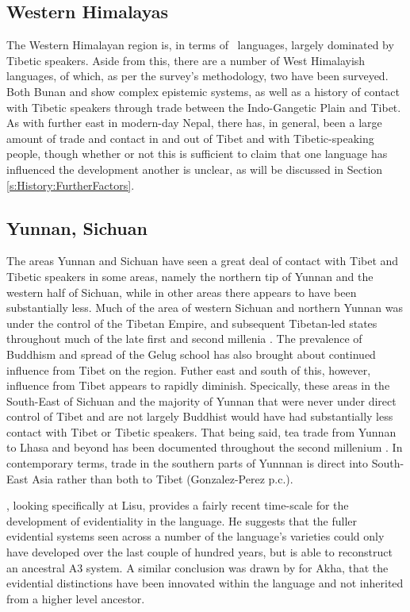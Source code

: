 \subsection{Western Himalayas}
The Western Himalayan region is, in terms of \lfam\ languages, largely dominated by Tibetic speakers. Aside from this, there are a number of West Himalayish languages, of which, as per the survey's methodology, two have been surveyed. Both Bunan  and  show complex epistemic systems, as well as a history of contact with Tibetic speakers through trade between the Indo-Gangetic Plain and Tibet. As with further east in modern-day Nepal, there has, in general, been a large amount of trade and contact in and out of Tibet and with Tibetic-speaking people, though whether or not this is sufficient to claim that one language has influenced the development another is unclear, as will be discussed in Section \ref{s:History:FurtherFactors}.

\subsection{Yunnan, Sichuan}\label{ss:History:YunSich}
The areas Yunnan and Sichuan have seen a great deal of contact with Tibet and Tibetic speakers in some areas, namely the northern tip of Yunnan and the western half of Sichuan, while in other areas there appears to have been substantially less. Much of the area of western Sichuan and northern Yunnan was under the control of the Tibetan Empire, and subsequent Tibetan-led states throughout much of the late first and second millenia \cite{Schaik2013}. The prevalence of Buddhism and spread of the Gelug school has also brought about continued influence from Tibet on the region. Futher east and south of this, however, influence from Tibet appears to rapidly diminish. Specically, these areas in the South-East of Sichuan and the majority of Yunnan that were never under direct control of Tibet and are not largely Buddhist would have had substantially less contact with Tibet or Tibetic speakers. That being said, tea trade from Yunnan to Lhasa and beyond has been documented throughout the second millenium \cite{Sigley2020}. In contemporary terms, trade in the southern parts of Yunnnan is direct into South-East Asia rather than both to Tibet (Gonzalez-Perez p.c.).

, looking specifically at Lisu, provides a fairly recent time-scale for the development of evidentiality in the language. He suggests that the fuller evidential systems seen across a number of the language's varieties could only have developed over the last couple of hundred years, but is able to reconstruct an ancestral A3 system. A similar conclusion was drawn by  for Akha, that the evidential distinctions have been innovated within the language and not inherited from a higher level ancestor.

